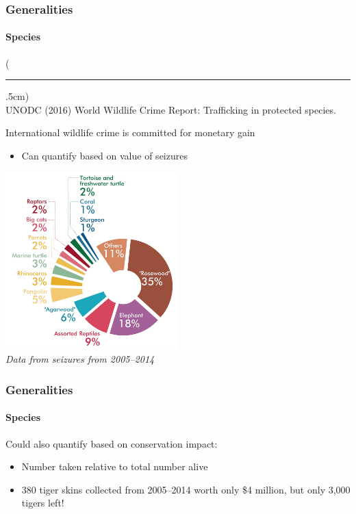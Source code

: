 \documentclass[10pt]{beamer}
\newenvironment{reference}[2]{%
	\begin{textblock*}{\textwidth}(#1,#2)
		\tiny\bgroup\color{gray}}{\egroup\end{textblock*}}
\begin{document}
\begin{frame}[t]
\frametitle{Generalities}
\framesubtitle{Species}
\vspace{0.25cm}

	\begin{reference}{4mm}{92mm}
		\rule{1.5cm}{0.25pt}\\
		UNODC (2016) World Wildlife Crime Report: Trafficking in protected species.
	\end{reference}

	International wildlife crime is committed for monetary gain
		\medskip
		\begin{itemize}
			\item Can quantify based on value of seizures
		\end{itemize}
		
		\begin{center}
			\includegraphics[width=0.5\textwidth]{figures/species_money.png}\\
			\vspace{0.1cm}
			\footnotesize{\emph{Data from seizures from 2005--2014}}
		\end{center}
\end{frame}


\begin{frame}[t]
\frametitle{Generalities}
\framesubtitle{Species}
\vspace{0.5cm}

	Could also quantify based on conservation impact:\\
	\medskip
		\begin{itemize}
			\item Number taken relative to total number alive\\
			\medskip
			\item 380 tiger skins collected from 2005--2014 worth only \$4 million, but only 3,000 tigers left!
		\end{itemize}
\end{frame}
\end{document}
